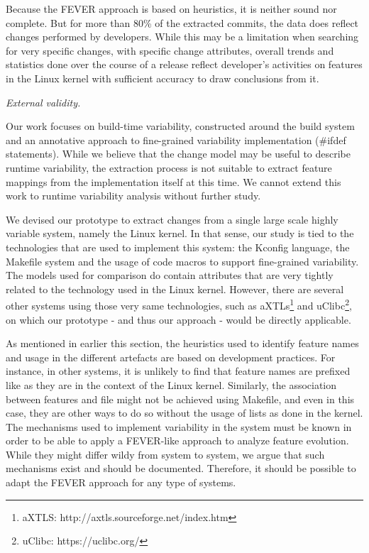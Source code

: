 Because the FEVER approach is based on heuristics, it is neither sound nor complete. 
But for more than 80\% of the extracted commits, the data does reflect changes performed by developers.
While this may be a limitation when searching for very specific changes, with specific change attributes, 
overall trends and statistics done over the course of a release reflect developer's activities on features in the Linux kernel
with sufficient accuracy to draw conclusions from it.

\textit{External validity.}

Our work focuses on build-time variability, constructed around the build system and 
an annotative approach to fine-grained variability implementation (\#ifdef statements).
While we believe that the change model may be useful to describe runtime variability,
the extraction process is not suitable to extract feature mappings from the implementation itself at this time.
We cannot extend this work to runtime variability analysis without further study.

We devised our prototype to extract changes from a single large scale highly variable system, namely the Linux kernel. 
In that sense, our study is tied to the technologies that are used to implement this system: the Kconfig language, 
the Makefile system and the usage of code macros to support fine-grained variability.
The models used for comparison do contain attributes that are very tightly related to the technology used in the Linux kernel.
However, there are several other systems using those very same technologies, such as aXTLs\footnote{aXTLS: http://axtls.sourceforge.net/index.htm} and uClibc\footnote{uClibc: https://uclibc.org/}, on which our prototype 
- and thus our approach - would be directly applicable.

As mentioned in earlier this section, the heuristics used to identify feature names and usage in the different artefacts are based on development practices.
For instance, in other systems, it is unlikely to find that feature names are prefixed like as they are in the context of the Linux kernel.
Similarly, the association between features and file might not be achieved using Makefile, and even in this case, they are other ways to do so without the usage of lists as done in the kernel.
The mechanisms used to implement variability in the system must be known in order to be able to apply a FEVER-like approach to analyze feature evolution.
While they might differ wildy from system to system, we argue that such mechanisms exist and should be documented. Therefore, it should be possible to adapt the FEVER approach 
for any type of systems.

